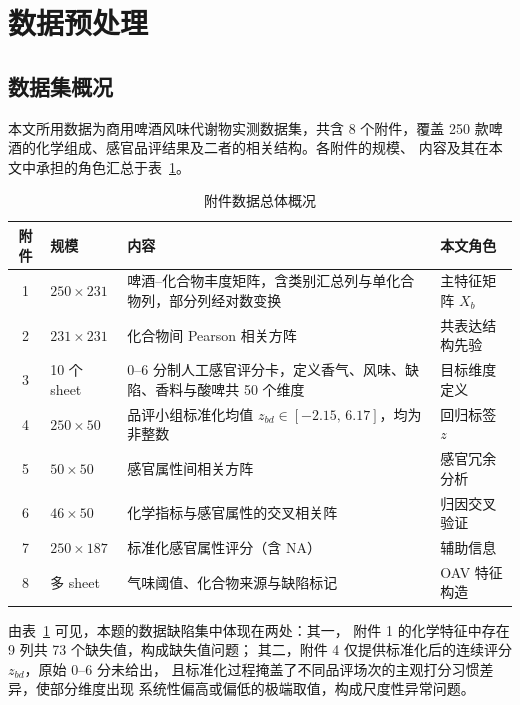 \documentclass[12pt,a4paper]{article}
\begin{document}
\newcommand{\figph}[2][0.85\textwidth]{%
\fbox{\begin{minipage}[c][#1][c]{0.92\linewidth}
\centering\small\color{gray} #2\[2pt]（出图后替换为 \texttt{\textbackslash includegraphics}）
\end{minipage}}}

\section{数据预处理}

\subsection{数据集概况}

本文所用数据为商用啤酒风味代谢物实测数据集，共含 8 个附件，覆盖
250 款啤酒的化学组成、感官品评结果及二者的相关结构。各附件的规模、
内容及其在本文中承担的角色汇总于表~\ref{tab:data_overview}。

\begin{table}[htbp]
\centering
\caption{附件数据总体概况}
\label{tab:data_overview}
\begin{tabular}{cp{2.4cm}p{5.0cm}p{3.4cm}}
\hline
附件 & 规模 & 内容 & 本文角色 \\
\hline
1 & $250\times 231$ & 啤酒--化合物丰度矩阵，含类别汇总列与单化合物列，部分列经对数变换 & 主特征矩阵 $X_b$ \\
2 & $231\times 231$ & 化合物间 Pearson 相关方阵 & 共表达结构先验 \\
3 & 10 个 sheet & 0--6 分制人工感官评分卡，定义香气、风味、缺陷、香料与酸啤共 50 个维度 & 目标维度定义 \\
4 & $250\times 50$ & 品评小组标准化均值 $z_{bd}\in[-2.15,\,6.17]$，均为非整数 & 回归标签 $z$ \\
5 & $50\times 50$ & 感官属性间相关方阵 & 感官冗余分析 \\
6 & $46\times 50$ & 化学指标与感官属性的交叉相关阵 & 归因交叉验证 \\
7 & $250\times 187$ & 标准化感官属性评分（含 NA） & 辅助信息 \\
8 & 多 sheet & 气味阈值、化合物来源与缺陷标记 & OAV 特征构造 \\
\hline
\end{tabular}
\end{table}

由表~\ref{tab:data_overview} 可见，本题的数据缺陷集中体现在两处：其一，
附件 1 的化学特征中存在 9 列共 73 个缺失值，构成缺失值问题；
其二，附件 4 仅提供标准化后的连续评分 $z_{bd}$，原始 0--6 分未给出，
且标准化过程掩盖了不同品评场次的主观打分习惯差异，使部分维度出现
系统性偏高或偏低的极端取值，构成尺度性异常问题。
\end{document}
